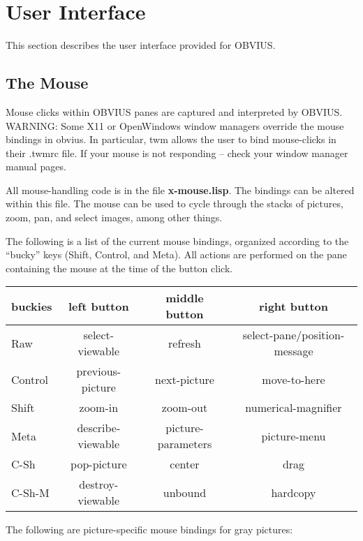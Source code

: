 
\section{User Interface}
\label{sec:userface}

This section describes the user interface provided for OBVIUS.

\subsection{The Mouse}
\label{sec:mouse}

Mouse clicks within OBVIUS panes are captured and interpreted by
OBVIUS.  WARNING: Some X11 or OpenWindows window managers override
the mouse bindings in obvius.  In particular, twm allows the user to
bind mouse-clicks in their .twmrc file.  If your mouse is not
responding -- check your window manager manual pages.

All mouse-handling code is in the file {\bf x-mouse.lisp}.  The
bindings can be altered within this file.  The mouse can be used to
cycle through the stacks of pictures, zoom, pan, and select images,
among other things.

The following is a list of the current mouse bindings, organized
according to the ``bucky'' keys (Shift, Control, and Meta).  All
actions are performed on the pane containing the mouse at the time of
the button click.

\begin{tabular}{|l|ccc|}
\hline
buckies & left button       & middle button  & right  button       \\
\hline
Raw	& select-viewable   & refresh        & select-pane/position-message    \\
Control & previous-picture  & next-picture   & move-to-here        \\
Shift 	& zoom-in           & zoom-out       & numerical-magnifier \\
Meta	& describe-viewable & picture-parameters & picture-menu    \\
C-Sh	& pop-picture       & center         & drag                \\
C-Sh-M	& destroy-viewable  & unbound        & hardcopy             \\
\hline
\end{tabular}

The following are picture-specific mouse bindings for gray pictures:

